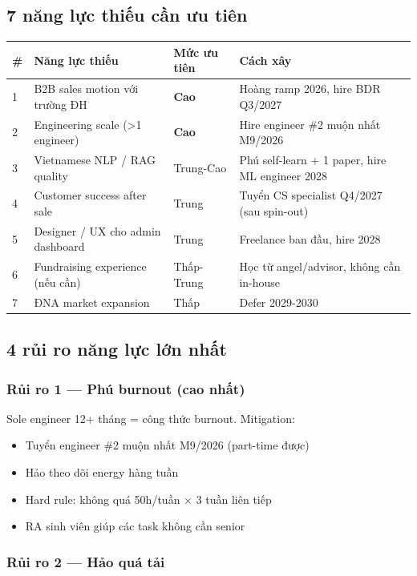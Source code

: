 \documentclass[11pt,a4paper]{article}
\begin{document}
\subsection{7 năng lực thiếu cần ưu tiên}

\begin{tabularx}{\linewidth}{@{}p{0.4cm} p{4cm} p{2cm} X@{}}
\toprule
\textbf{\#} & \textbf{Năng lực thiếu} & \textbf{Mức ưu tiên} & \textbf{Cách xây} \\
\midrule
1 & B2B sales motion với trường ĐH & \textbf{Cao} & Hoàng ramp 2026, hire BDR Q3/2027 \\
2 & Engineering scale (>1 engineer) & \textbf{Cao} & Hire engineer \#2 muộn nhất M9/2026 \\
3 & Vietnamese NLP / RAG quality & Trung-Cao & Phú self-learn + 1 paper, hire ML engineer 2028 \\
4 & Customer success after sale & Trung & Tuyển CS specialist Q4/2027 (sau spin-out) \\
5 & Designer / UX cho admin dashboard & Trung & Freelance ban đầu, hire 2028 \\
6 & Fundraising experience (nếu cần) & Thấp-Trung & Học từ angel/advisor, không cần in-house \\
7 & ĐNA market expansion & Thấp & Defer 2029-2030 \\
\bottomrule
\end{tabularx}

\subsection{4 rủi ro năng lực lớn nhất}

\subsubsection*{Rủi ro 1 --- Phú burnout (cao nhất)}

Sole engineer 12+ tháng = công thức burnout. Mitigation:
\begin{itemize}
\item Tuyển engineer \#2 muộn nhất M9/2026 (part-time được)
\item Hảo theo dõi energy hàng tuần
\item Hard rule: không quá 50h/tuần × 3 tuần liên tiếp
\item RA sinh viên giúp các task không cần senior
\end{itemize}

\subsubsection*{Rủi ro 2 --- Hảo quá tải}
\end{document}
